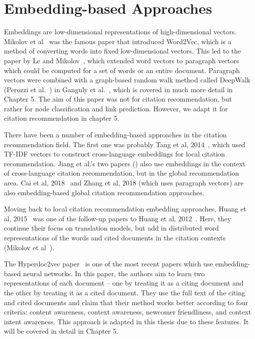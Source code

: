 \section{Embedding-based Approaches}
Embeddings are low-dimensional representations of high-dimensional vectors. 
Mikolov et al~\cite{MikolovSCCD13} was the famous paper that introduced Word2Vec, which is a method of converting words into fixed low-dimensional vectors. This led to the paper by Le and Mikolov~\cite{LeM14}, which extended word vectors to paragraph vectors which could be computed for a set of words or an entire document. 
Paragraph vectors were combined with a graph-based random walk method called DeepWalk (Perozzi et al.~\cite{PerozziAS14}) in Ganguly et al.~\cite{GangulyP17}, which is covered in much more detail in Chapter 5. The aim of this paper was not for citation recommendation, but rather for node classification and link prediction. However, we adapt it for citation recommendation in chapter 5. 

There have been a number of embedding-based approaches in the citation recommendation field. The first one was probably Tang et al, 2014~\cite{TangWZ14}, which used TF-IDF vectors to construct cross-language embeddings for local citation recommendation. Jiang et al.'s two papers (\cite{JiangLL18,JiangYGLL18}) also use embeddings in the context of cross-language citation recommendation, but in the global recommendation area. Cai et al, 2018~\cite{CaiHY18} and Zhang et al, 2018 \cite{ZhangYCD18} (which uses paragraph vectors) are also embedding-based global citation recommendation approaches.

Moving back to local citation recommendation embedding approaches, Huang et al, 2015~\cite{Huang2015} was one of the follow-up papers to Huang et al, 2012~\cite{HuangKCMGR12}. Here, they continue their focus on translation models, but add in distributed word representations of the words and cited documents in the citation contexts (Mikolov et al~\cite{MikolovSCCD13}). 

The Hyperdoc2vec paper~\cite{ShiSZZH18} is one of the most recent papers which use embedding-based neural networks. In this paper, the authors aim to learn two representations of each document -- one by treating it as a citing document and the other by treating it as a cited document. They use the full text of the citing and cited documents and claim that their method works better according to four criteria: content awareness, context awareness, newcomer friendliness, and context intent awareness. This approach is adapted in this thesis due to these features. It will be covered in detail in Chapter 5. 
